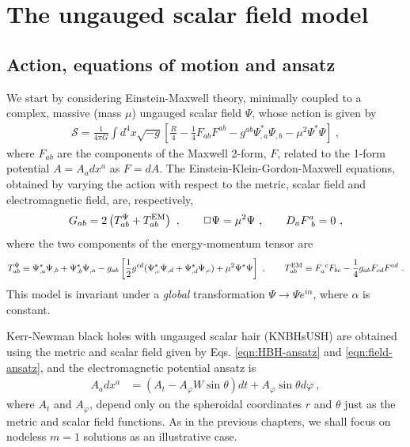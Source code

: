 \section{The ungauged scalar field model}
\label{sec_mod_u}
\subsection{Action, equations of motion and ansatz}
\label{sec_mofrl}
We start by considering Einstein-Maxwell theory, minimally coupled to a complex, massive (mass $\mu$)  ungauged scalar field $\Psi$, whose action is given by
%
\begin{eqnarray}
  \label{KNaction}
 \mathcal{S} = \frac{1}{4\pi G}\int d^4x \sqrt{-g}\left[\frac{R}{4}- \frac{1}{4}F_{ab}F^{ab}- g^{ab}\Psi^*_{,a}\Psi_{,b} -\mu^2\Psi^*\Psi \right]\ ,  
\end{eqnarray}  
where $F_{ab}$ are the components of the Maxwell 2-form, $F$, related to the 1-form potential $A=A_adx^a$ as $F=dA$. The Einstein-Klein-Gordon-Maxwell equations, obtained by varying the action with respect to the metric, scalar field and electromagnetic field, are, respectively,
%
%
\begin{equation}
G_{ab}  = 2\left( T_{ab}^\Psi+T_{ab} ^{\rm EM} \right)\ , \qquad \Box \Psi =\mu^2\Psi \ , \qquad D_aF^a_{~b}=0 \ ,
\label{KNeom}
\end{equation}
where the two components of the energy-momentum tensor are
%
\begin{equation}
\label{KNemt}
T_{ab}^\Psi \equiv  
 \Psi_{ , a}^*\Psi_{,b}
+\Psi_{,b}^*\Psi_{,a} 
-g_{ab}  \left[ \frac{1}{2} g^{cd} 
 ( \Psi_{,c}^*\Psi_{,d}+
\Psi_{,d}^*\Psi_{,c} )+\mu^2 \Psi^*\Psi\right] \ , \qquad
 T_{ab}^{\rm EM} \equiv F_a^{~c}F_{bc} - \frac{1}{4}g_{ab}F_{cd}F^{cd} \ .
\end{equation}
This model is invariant under a \textit{global} transformation $\Psi\rightarrow \Psi e^{i\alpha}$, where $\alpha$ is constant.



Kerr-Newman black holes with ungauged scalar hair (KNBHsUSH) are obtained using the metric and scalar field given by Eqs. \eqref{eqn:HBH-ansatz} and \eqref{eqn:field-ansatz}, and the electromagnetic potential ansatz is
%
\begin{align}
 \label{electric_ansatz}
 A_adx^a &= \left( A_t - A_\varphi W\sin\theta \right)dt + A_\varphi\sin\theta d\varphi \ ,
\end{align}
where $A_t$ and $A_\varphi$, depend only on the spheroidal coordinates $r$ and $\theta$ just as the metric and scalar field functions.
As in the previous chapters, we shall focus on nodeless $m=1$ solutions as an illustrative case.

